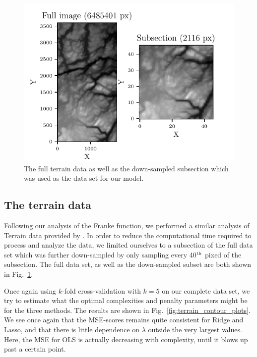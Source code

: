 \documentclass[reprint, english, nofootinbib]{revtex4-2}
\begin{document}


\begin{figure}[h!tb]
    \center
    \includegraphics[width=\columnwidth]{TerrainData.pdf}
    \caption{\label{fig:terrain image}The full terrain data as well as the down-sampled subsection which was used as the data set for our model.}
\end{figure}

\subsection{The terrain data}
\noindent
Following our analysis of the Franke function, we performed a similar analysis of Terrain data provided by \cite{4155_repo}. In order to reduce the computational time required to process and analyze the data, we limited ourselves to a subsection of the full data set which was further down-sampled by only sampling every 40$^{\textup{th}}$ pixed of the subsection. The full data set, as well as the down-sampled subset are both shown in Fig.~\ref{fig:terrain image}.

Once again using $k$-fold cross-validation with $k=5$ on our complete data set, we try to estimate what the optimal complexities and penalty parameters might be for the three methods. The results are shown in Fig.~\ref{fig:terrain_contour_plots}. We see once again that the MSE-scores remains quite consistent for Ridge and Lasso, and that there is little dependence on $\lambda$ outside the very largest values. Here, the MSE for OLS is actually decreasing with complexity, until it blows up past a certain point.
\end{document}
